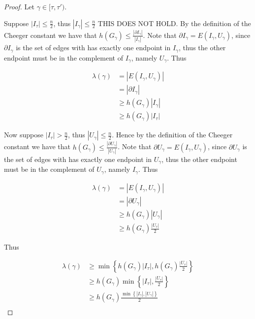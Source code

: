\documentclass[a4paper,11pt]{article}
\theoremstyle{definition}
\begin{document}
\begin{proof}
	Let $ \gamma \in [\tau, \tau')$.

	Suppose $|I_{\tau}| \leq \frac{n}{2}$, thus $|I_\gamma| \leq \frac{n}{2}$ THIS DOES NOT HOLD. By the definition of the Cheeger constant we have that $h(G_\gamma) \leq \frac{|\partial I_\gamma|}{|I_\gamma|}$. Note that $ \partial I_\gamma = E(I_\gamma, U_\gamma)$, since $\partial I_\gamma$ is the set of edges with has exactly one endpoint in $I_\gamma$, thus the other endpoint must be in the complement of $I_\gamma$, namely $U_\gamma$. Thus

	\begin{align*}
		\lambda(\gamma) &= |E(I_\gamma, U_\gamma)| \\
		& = |\partial I_\gamma| \\
		& \geq h(G_\gamma) |I_\gamma| \\
		& \geq h(G_\gamma) |I_\tau|
	\end{align*}
		
	Now suppose $|I_\tau| > \frac{n}{2}$, thus $|U_\gamma| \leq \frac{n}{2}$. Hence by the definition of the Cheeger constant we have that $h(G_\gamma) \leq \frac{|\partial U_\gamma|}{|U_\gamma|}$. Note that $ \partial U_\gamma = E(I_\gamma, U_\gamma)$, since $\partial U_\gamma$ is the set of edges with has exactly one endpoint in $U_\gamma$,  thus the other endpoint must be in the complement of $U_\gamma$, namely $I_\gamma$. Thus 

	\begin{align*}
		\lambda(\gamma) &= |E(I_\gamma, U_\gamma)| \\
		& = |\partial U_\gamma| \\
		& \geq h(G_\gamma) |U_\gamma| \\
		& \geq h(G_\gamma) \frac{|U_\tau|}{2}
	\end{align*}

		
	Thus %

	\begin{align*}
		\lambda(\gamma) &\geq \min \left\{ h(G_\gamma) |I_\tau|, h(G_\gamma) \frac{|U_\tau|}{2} \right\} \\
		& \geq h(G_\gamma) \min \left\{|I_\tau|, \frac{|U_\tau|}{2} \right\} \\
		& \geq h(G_\gamma) \frac{\min \left\{|I_\gamma|,|U_\gamma| \right\}}{2}\\
	\end{align*}

\end{proof}
\end{document}
